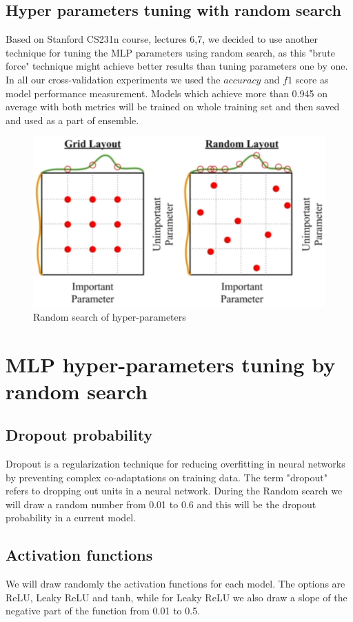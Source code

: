 \documentclass[12pt]{article}
\begin{document}
\subsection{Hyper parameters tuning with random search}
Based on Stanford CS231n course, lectures 6,7, we decided to use another technique for tuning the MLP parameters using random search, as this "brute force" technique might achieve better results than tuning parameters one by one. In all our cross-validation experiments we used the $accuracy$ and $f1$ score as model performance measurement. Models which achieve more than 0.945 on average with both metrics will be trained on whole training set and then saved and used as a part of ensemble.

\begin{figure}[h]
\centering
\includegraphics[width=.6\linewidth]{pics/random_search}
\caption{Random search of hyper-parameters}
\end{figure}

\section{MLP hyper-parameters tuning by random search}
\subsection{Dropout probability}
Dropout is a regularization technique for reducing overfitting in neural networks by preventing complex co-adaptations on training data. The term "dropout" refers to dropping out units in a neural network. During the Random search we will draw a random number from 0.01 to 0.6 and this will be the dropout probability in a current model. 
\subsection{Activation functions}
We will draw randomly the activation functions for each model. The options are ReLU, Leaky ReLU and tanh, while for Leaky ReLU we also draw a slope of the negative part of the function from 0.01 to 0.5.
\end{document}
